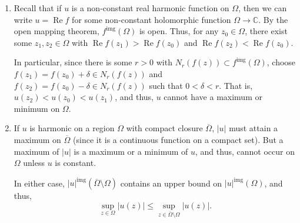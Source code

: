 \documentclass[12 pt, letterpaper]{hmcpset}
\begin{document}
\begin{solution}
	\begin{enumerate}
		\item Recall that if $u$ is a non-constant real harmonic function on $\Omega$, then we can write $u = \operatorname{Re} f$ for some non-constant holomorphic function $\Omega \to \mathbb{C}$. By the open mapping theorem, $f^{\text{img}}(\Omega)$ is open. Thus, for any $z_{0} \in \Omega$, there exist some $z_{1}, z_{2} \in \Omega$ with $\operatorname{Re} f(z_{1}) > \operatorname{Re} f(z_{0})$ and $\operatorname{Re} f(z_{2}) < \operatorname{Re} f(z_{0})$. 

			In particular, since there is some $r > 0$ with $N_{r}(f(z)) \subset f^{\text{img}}(\Omega)$, choose $f(z_{1}) = f(z_{0}) + \delta \in N_{r}(f(z))$ and $f(z_{2}) = f(z_{0}) - \delta \in N_{r}(f(z))$ such that $0 < \delta < r$. That is, $u(z_{2}) < u(z_{0}) < u(z_{1})$, and thus, $u$ cannot have a maximum or minimum on $\Omega$.
		\item If $u$ is harmonic on a region $\Omega$ with compact closure $\overline{\Omega}$, $\lvert u \rvert$ must attain a maximum on $\overline{\Omega}$ (since it is a continuous function on a compact set). But a maximum of $\lvert u \rvert$ is a maximum or a minimum of $u$, and thus, cannot occur on $\Omega$ unless $u$ is constant.

			In either case, $\lvert u \rvert^{\text{img}}(\overline{\Omega} \setminus \Omega)$ contains an upper bound on $\lvert u \rvert^{\text{img}}(\Omega)$, and thus,
			\[
				\sup_{z \in \Omega} \lvert u(z) \rvert \le \sup_{z \in \overline{\Omega} \setminus \Omega} \lvert u(z) \rvert.
			\]
	\end{enumerate}
\end{solution}
\end{document}
